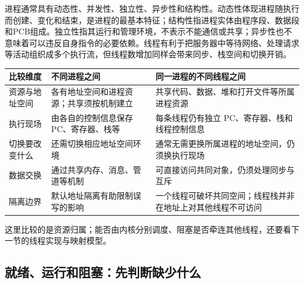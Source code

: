 进程通常具有动态性、并发性、独立性、异步性和结构性。动态性体现进程随执行而创建、变化和结束，是进程的最基本特征；结构性指进程实体由程序段、数据段和PCB组成。独立性指其运行和管理环境，不表示不能通信或共享；异步性也不意味着可以违反自身指令的必要依赖。线程有利于把服务器中等待网络、处理请求等活动组织成多个执行流，但线程数增加同样会带来同步、栈空间和切换开销。

\begin{wideblock}

\par\medskip\noindent\begin{minipage}{\linewidth}\fontsize{9.3}{12}\selectfont\begin{tabularx}{\linewidth}{@{}YYY@{}}
\toprule\noalign{}
\begin{minipage}[b]{\linewidth}\raggedright
比较维度
\end{minipage} & \begin{minipage}[b]{\linewidth}\raggedright
不同进程之间
\end{minipage} & \begin{minipage}[b]{\linewidth}\raggedright
同一进程的不同线程之间
\end{minipage} \\
\midrule\noalign{}


资源与地址空间 & 各有地址空间和进程资源；共享须按机制建立 & 共享代码、数据、堆和打开文件等所属进程资源 \\
执行现场 & 由各自的控制信息保存 PC、寄存器、栈等 & 每条线程仍有独立 PC、寄存器、栈和线程控制信息 \\
切换要改变什么 & 还需切换相应地址空间环境 & 通常无需更换所属进程的地址空间，仍须换执行现场 \\
数据交换 & 通过共享内存、消息、管道等机制 & 可直接访问共同对象，仍须处理同步与互斥 \\
隔离边界 & 默认地址隔离有助限制误写的影响 & 一个线程可破坏共同空间；线程栈并非在地址上对其他线程不可访问 \\
\bottomrule\end{tabularx}
\end{minipage}\par\medskip

\end{wideblock}

这里比较的是资源归属；能否由内核分别调度、阻塞是否牵连其他线程，还要看下一节的线程实现与映射模型。

\subsection{就绪、运行和阻塞：先判断缺少什么}\label{OS02-2-2}

